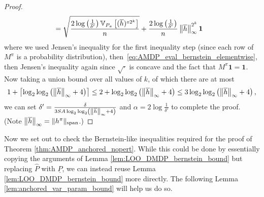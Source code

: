 \documentclass{article}
\theoremstyle{plain}
\theoremstyle{plain}
\theoremstyle{remark}
\theoremstyle{plain}
\theoremstyle{plain}
\newcommand{\Var}{\mathbb{V}}
\newcommand{\Phat}{\widehat{P}}
\newcommand{\one}{\mathbf{1}}
\newcommand{\hc}{\overline{h}}
\newcommand{\Phatanc}{\underline{\Phat}}
\begin{document}
\begin{proof}
\begin{align*}
        &= \sqrt{\frac{2 \log \left( \frac{1}{\delta'}\right)  \Var_{P_\pi}\left[(\hc)^{\circ 2^k} \right] }{n}} + \frac{2 \log \left( \frac{1}{\delta'}\right)   }{ n} \infnorm{\hc}^{2^k} \one
    \end{align*}
    where we used Jensen's inequality for the first inequality step (since each row of $M^\pi$ is a probability distribution), then~\eqref{eq:AMDP_eval_bernstein_elementwise}, then Jensen's inequality again since $\sqrt{\cdot}$ is concave and the fact that $M^\pi \one = \one$. Now taking a union bound over all values of $k$, of which there are at most
    \begin{align*}
        1 + \left\lceil \log_2 \log_2 \left(\infnorm{\hc} + 4 \right) \right\rceil \leq 2 +  \log_2 \log_2 \left(\infnorm{\hc} + 4 \right) \leq 3   \log_2 \log_2 \left(\infnorm{\hc} + 4 \right),
    \end{align*}
    we can set $\delta' = \frac{\delta}{3 SA    \log_2 \log_2 \left(\infnorm{\hc} + 4 \right)}$ and $\alpha = 2 \log \frac{1}{\delta'}$ to complete the proof. (Note $\infnorm{\hc} = \spannorm{h^\pi}$.)
\end{proof}

Now we set out to check the Bernstein-like inequalities required for the proof of Theorem \ref{thm:AMDP_anchored_nopert}. While this could be done by essentially copying the arguments of Lemma \ref{lem:LOO_DMDP_bernstein_bound} but replacing $\Phat$ with $\Phatanc$, we can instead reuse Lemma \ref{lem:LOO_DMDP_bernstein_bound} more directly. The following Lemma \ref{lem:anchored_var_param_bound} will help us do so.
\end{document}
